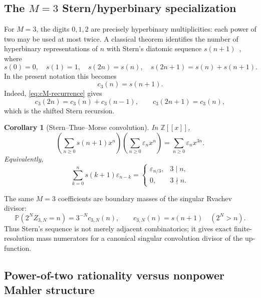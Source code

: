 \documentclass[11pt,oneside]{article}
\newtheorem{corollary}[theorem]{Corollary}
\theoremstyle{definition}
\theoremstyle{remark}
\newcommand{\Z}{\mathbb Z}
\numberwithin{equation}{section}
\newcommand{\eps}{\varepsilon}
\newcommand{\1}{\mathbf 1}
\begin{document}
\subsection{The $M=3$ Stern/hyperbinary specialization}

For $M=3$, the digits $0,1,2$ are precisely hyperbinary multiplicities: each power of two
may be used at most twice.  A classical theorem identifies the number of hyperbinary
representations of $n$ with Stern's diatomic sequence $s(n+1)$~\cite{DilcherEricksen2015}, where
\begin{equation}
 s(0)=0,
 \quad s(1)=1,
 \quad s(2n)=s(n),
 \quad s(2n+1)=s(n)+s(n+1).
 \label{eq:Stern}
\end{equation}
In the present notation this becomes
\begin{equation}
 c_3(n)=s(n+1).
 \label{eq:c3-Stern}
\end{equation}
Indeed, \eqref{eq:cM-recurrence} gives
\begin{equation}
 c_3(2n)=c_3(n)+c_3(n-1),
 \qquad
 c_3(2n+1)=c_3(n),
 \label{eq:c3-recurrence}
\end{equation}
which is the shifted Stern recursion.

\begin{corollary}[Stern--Thue--Morse convolution]
\label{cor:Stern-TM}
In $\Z[[x]]$,
\begin{equation}
 \boxed{
 \left(\sum_{n\ge0}s(n+1)x^n\right)
 \left(\sum_{n\ge0}\eps_nx^n\right)
 =\sum_{n\ge0}\eps_nx^{3n}.}
 \label{eq:Stern-TM}
\end{equation}
Equivalently,
\begin{equation}
 \sum_{k=0}^{n}s(k+1)\eps_{n-k}
 =\begin{cases}
 \eps_{n/3},&3\mid n,\\0,&3\nmid n.
 \end{cases}
 \label{eq:Stern-TM-coeff}
\end{equation}
\end{corollary}

The same $M=3$ coefficients are boundary masses of the singular Rvachev divisor:
\begin{equation}
 \mathbb P(2^NZ_{3,N}=n)=3^{-N}c_{3,N}(n),
 \qquad
 c_{3,N}(n)=s(n+1)\quad(2^N>n).
 \label{eq:Stern-masses}
\end{equation}
Thus Stern's sequence is not merely adjacent combinatorics; it gives exact finite-resolution
mass numerators for a canonical singular convolution divisor of the up-function.

\subsection{Power-of-two rationality versus nonpower Mahler structure}
\end{document}
